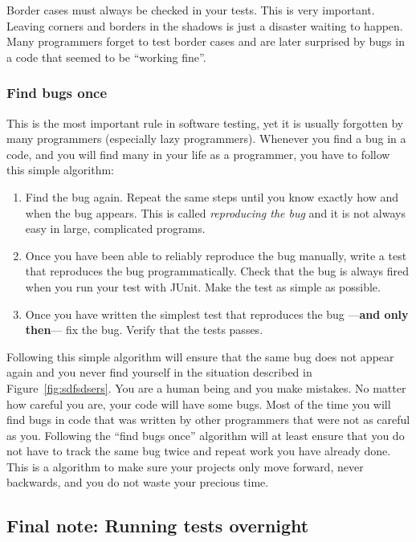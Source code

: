Border cases must always be checked in your tests. This is very
important. Leaving corners and borders in the shadows is just a
disaster waiting to happen. Many programmers forget to test border
cases and are later surprised by bugs in a code that seemed to be
``working fine''.

\subsubsection{Find bugs once}
\label{sec:find-bugs-once}

This is the most important rule in software testing, yet it is usually
forgotten by many programmers (especially lazy programmers). Whenever
you find a bug in a code, and you will find many in your life as a
programmer, you have to follow this simple algorithm: 

\begin{enumerate}
\item Find the bug again. Repeat the same steps until you know exactly
  how and when the bug appears. This is called
  \emph{reproducing the bug} and it is not always easy in large,
  complicated programs.
\item Once you have been able to reliably reproduce the bug manually,
  write a test that reproduces the bug programmatically. Check that
  the bug is always fired when you run your test with JUnit. Make the
  test as simple as possible.
\item Once you have written the simplest test that reproduces the bug
  ---\textbf{and only then}--- fix the bug. Verify that the tests passes. 
\end{enumerate}

Following this simple algorithm will ensure that the same bug does not
appear again and you never find yourself in the situation described in
Figure~\ref{fig:sdfsdsers}. You are a human being and you make mistakes. No
matter how careful you are, your code will have some bugs. Most of the
time you will find bugs in code that was written by other programmers
that were not as careful as you. Following the ``find bugs once''
algorithm will at least ensure that you do not have to track the same bug
twice and repeat work you have already done. This is a algorithm to make
sure your projects only move forward, never backwards, and you do not
waste your precious time. 

\subsection*{Final note: Running tests overnight}
\label{sec:runn-tests-overn}

